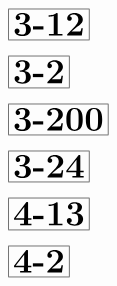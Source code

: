 \documentclass[a4paper, 10pt]{article}
\begin{document}
\begin{minipage}[t]{0.15\textwidth}
                \vspace*{-3.5cm}
        \hspace*{0.75cm}
        $\boxed{\textbf{\Huge3-12}}$
\end{minipage}
\begin{minipage}[t]{0.85\textwidth}
    
\end{minipage}

\begin{minipage}[t]{0.15\textwidth}
                \vspace*{-3.5cm}
        \hspace*{1.25cm}
        $\boxed{\textbf{\Huge3-2}}$
\end{minipage}
\begin{minipage}[t]{0.85\textwidth}
    
\end{minipage}

\begin{minipage}[t]{0.15\textwidth}
                \vspace*{-3.5cm}
        \hspace*{0.25cm}
        $\boxed{\textbf{\Huge3-200}}$
\end{minipage}
\begin{minipage}[t]{0.85\textwidth}
    
\end{minipage}

\begin{minipage}[t]{0.15\textwidth}
                \vspace*{-3.5cm}
        \hspace*{0.75cm}
        $\boxed{\textbf{\Huge3-24}}$
\end{minipage}
\begin{minipage}[t]{0.85\textwidth}
    
\end{minipage}

\begin{minipage}[t]{0.15\textwidth}
                \vspace*{-3.5cm}
        \hspace*{0.75cm}
        $\boxed{\textbf{\Huge4-13}}$
\end{minipage}
\begin{minipage}[t]{0.85\textwidth}
    
\end{minipage}

\begin{minipage}[t]{0.15\textwidth}
                \vspace*{-3.5cm}
        \hspace*{1.25cm}
        $\boxed{\textbf{\Huge4-2}}$
\end{minipage}
\begin{minipage}[t]{0.85\textwidth}
    
\end{minipage}
\end{document}
